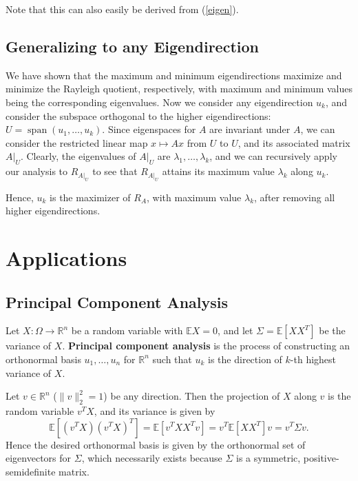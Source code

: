 \documentclass[reqno]{amsart}
\numberwithin{equation}{section}
\begin{document}
Note that this can also easily be derived from (\ref{eigen}).

\subsection{Generalizing to any Eigendirection}

We have shown that the maximum and minimum eigendirections maximize and
minimize the Rayleigh quotient, respectively, with maximum and minimum
values being the corresponding eigenvalues.
Now we consider any
eigendirection $u_k$, and consider the subspace
orthogonal to the higher eigendirections: $U = \operatorname{span}(u_1,
\ldots, u_k)$. Since eigenspaces for $A$ are invariant under $A$,
we can consider the restricted linear map $x \mapsto Ax$ from $U$ to $U$,
and its associated matrix $\left.A\right|_U$. Clearly, the eigenvalues of
$\left.A\right|_U$ are $\lambda_1, \ldots, \lambda_k$, and we can
recursively apply our analysis to $R_{\left.A\right|_U}$ to see that
$R_{\left.A\right|_U}$ attains its maximum value $\lambda_k$ along $u_k$.

Hence, $u_k$ is the maximizer of $R_A$, with maximum value $\lambda_k$,
after removing all higher eigendirections.

\section{Applications}

\subsection{Principal Component Analysis}

Let $X : \Omega \to \mathbb R^n$ be a random variable with $\mathbb E X = 0$,
and let
$\Sigma = \mathbb E\left[ XX^T\right]$ be the variance of $X$. \textbf{Principal
component analysis} is the process of constructing an orthonormal basis
$u_1, \ldots, u_n$ for $\mathbb R^n$ such that $u_k$ is the direction of
$k$-th highest variance of $X$.

Let $v \in \mathbb R^n$ ($\|v\|_2^2 = 1$) be any direction. Then the
projection of $X$ along $v$ is the random variable $v^TX$, and its variance
is given by
$$
    \mathbb E \left[(v^TX)(v^TX)^T\right] = \mathbb E \left[v^T X X^T v\right]
        = v^T  \mathbb E\left[ XX^T \right] v = v^T \Sigma v.
$$
Hence the desired orthonormal basis is given by the orthonormal set of
eigenvectors for $\Sigma$, which necessarily exists because $\Sigma$ is
a symmetric, positive-semidefinite matrix.
\end{document}
